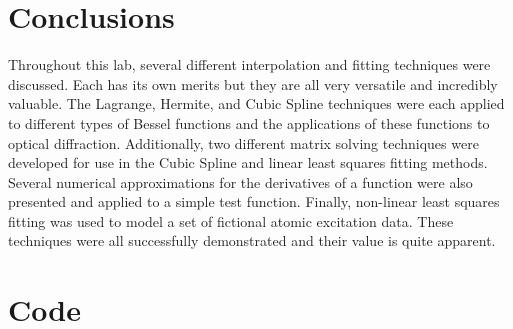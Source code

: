 \documentclass[12pt]{article}
\begin{document}
\section{Conclusions}
Throughout this lab, several different interpolation and fitting techniques were discussed.  Each has its own merits but they are all very versatile and incredibly valuable.  The Lagrange, Hermite, and Cubic Spline techniques were each applied to different types of Bessel functions and the applications of these functions to optical diffraction.  Additionally, two different matrix solving techniques were developed for use in the Cubic Spline and linear least squares fitting methods.  Several numerical approximations for the derivatives of a function were also presented and applied to a simple test function.  Finally, non-linear least squares fitting was used to model a set of fictional atomic excitation data.  These techniques were all successfully demonstrated and their value is quite apparent.


\pagebreak
\section{Code}
\end{document}
